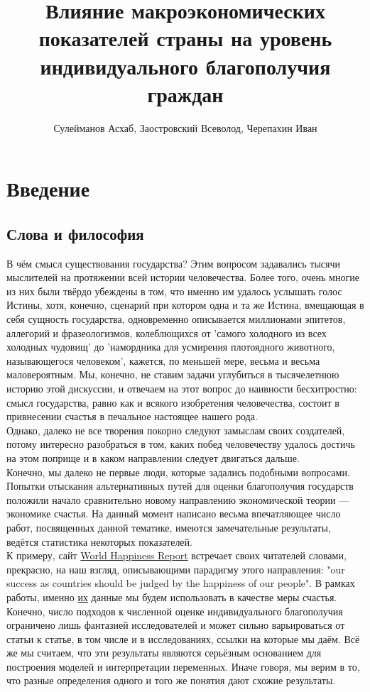 \documentclass[russian]{vegareport}
\title{Влияние макроэкономических показателей страны на уровень индивидуального благополучия граждан}
\author{Сулейманов Асхаб, Заостровский Всеволод, Черепахин Иван}
\date{}
\begin{document}
    \maketitle

    \chapter{Введение}
        \section{Слова и философия}
        В чём смысл существования государства? Этим вопросом задавались тысячи мыслителей на протяжении всей истории человечества. Более того, очень многие из них были твёрдо убеждены в том, что именно им удалось услышать голос Истины, хотя, конечно, сценарий при котором одна и та же Истина, вмещающая в себя сущность государства, одновременно описывается миллионами эпитетов, аллегорий и фразеологизмов, колеблющихся от 'самого холодного из всех холодных чудовищ' до 'намордника для усмирения плотоядного животного, называющегося человеком', кажется, по меньшей мере, весьма и весьма маловероятным. Мы, конечно, не ставим задачи углубиться в тысячелетнюю историю этой дискуссии, и отвечаем на этот вопрос до наивности бесхитростно: смысл государства, равно как и всякого изобретения человечества, состоит в привнесении счастья в печальное настоящее нашего рода.
        \\
        Однако, далеко не все творения покорно следуют замыслам своих создателей, потому интересно разобраться в том, каких побед человечеству удалось достичь на этом поприще и в каком направлении следует двигаться дальше.
        \\
        Конечно, мы далеко не первые люди, которые задались подобными вопросами. Попытки отыскания альтернативных путей для оценки благополучия государств положили начало сравнительно новому направлению экономической теории --- экономике счастья. На данный момент написано весьма впечатляющее число работ, посвященных данной тематике, имеются замечательные результаты, ведётся статистика некоторых показателей.
        \\
        К примеру, сайт \href{https://worldhappiness.report/}{World Happiness Report} встречает своих читателей словами, прекрасно, на наш взгляд, описывающими парадигму этого направления: "our success as countries should be judged by the happiness of our people". В рамках работы, именно \href{https://www.kaggle.com/datasets/mathurinache/world-happiness-report-20152021?select=2016.csv}{их} данные мы будем использовать в качестве меры счастья. Конечно, число подходов к численной оценке индивидуального благополучия ограничено лишь фантазией исследователей и может сильно варьироваться от статьи к статье, в том числе и в исследованиях, ссылки на которые мы даём. Всё же мы считаем, что эти результаты являются серьёзным основанием для построения моделей и интерпретации переменных. Иначе говоря, мы верим в то, что разные определения одного и того же понятия дают схожие результаты.
\end{document}
